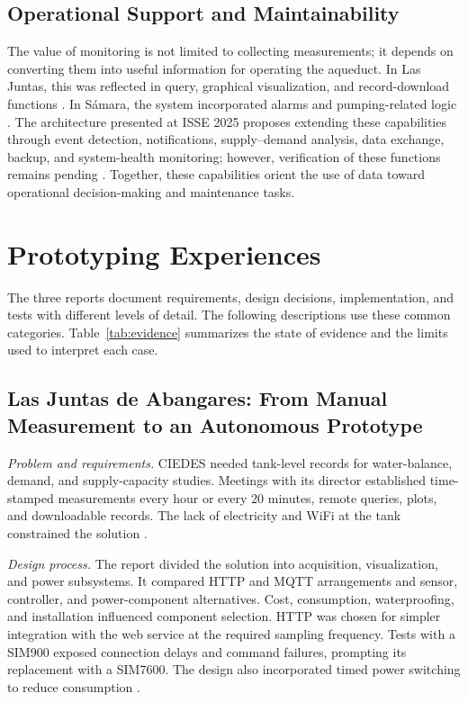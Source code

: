 \documentclass[conference]{IEEEtran}
\begin{document}
\subsection{Operational Support and Maintainability}

The value of monitoring is not limited to collecting measurements; it depends on converting them into useful information for operating the aqueduct. In Las Juntas, this was reflected in query, graphical visualization, and record-download functions \cite{chavarria2021implementacion}. In S\'{a}mara, the system incorporated alarms and pumping-related logic \cite{solorzano2021sistema}. The architecture presented at ISSE 2025 proposes extending these capabilities through event detection, notifications, supply--demand analysis, data exchange, backup, and system-health monitoring; however, verification of these functions remains pending \cite{arguedas2025towards}. Together, these capabilities orient the use of data toward operational decision-making and maintenance tasks.

\section{Prototyping Experiences}

The three reports document requirements, design decisions, implementation, and tests with different levels of detail. The following descriptions use these common categories. Table~\ref{tab:evidence} summarizes the state of evidence and the limits used to interpret each case.

\subsection{Las Juntas de Abangares: From Manual Measurement to an Autonomous Prototype}

\emph{Problem and requirements.} CIEDES needed tank-level records for water-balance, demand, and supply-capacity studies. Meetings with its director established time-stamped measurements every hour or every 20 minutes, remote queries, plots, and downloadable records. The lack of electricity and WiFi at the tank constrained the solution \cite[Secs.~4.1--4.3]{chavarria2021implementacion}.

\emph{Design process.} The report divided the solution into acquisition, visualization, and power subsystems. It compared HTTP and MQTT arrangements and sensor, controller, and power-component alternatives. Cost, consumption, waterproofing, and installation influenced component selection. HTTP was chosen for simpler integration with the web service at the required sampling frequency. Tests with a SIM900 exposed connection delays and command failures, prompting its replacement with a SIM7600. The design also incorporated timed power switching to reduce consumption \cite[Secs.~4.4--4.6 and 5.1]{chavarria2021implementacion}.
\end{document}
